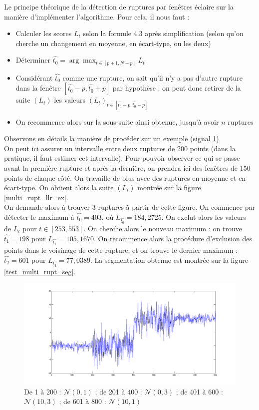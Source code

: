 \documentclass[french,11pt,notitlepage]{report}
\begin{document}
	
	Le principe théorique de la détection de ruptures par fenêtres éclaire sur la manière d'implémenter l'algorithme. Pour cela, il nous faut :
	\begin{itemize}
		\item Calculer les scores $L_t$ selon la formule 4.3 après simplification (selon qu'on cherche un changement en moyenne, en écart-type, ou les deux)
		\item Déterminer $\hat{t_0} = \arg \max_{t \in [p+1, N-p]} L_t$
		\item Considérant $\hat{t_0}$ comme une rupture, on sait qu'il n'y a pas d'autre rupture dans la fenêtre $[\hat{t_0}-p, \hat{t_0}+p]$ par hypothèse ; on peut donc retirer de la suite $(L_t)$ les valeurs $(L_t)_{t \in [\hat{t_0}-p, \hat{t_0}+p]}$
		\item On recommence alors sur la sous-suite ainsi obtenue, jusqu'à avoir $n$ ruptures
	\end{itemize}
	
	Observons en détails la manière de procéder sur un exemple (signal \ref{test_multi_rupt})
\\

	On peut ici assurer un intervalle entre deux ruptures de 200 points (dans la pratique, il faut estimer cet intervalle).
	Pour pouvoir observer ce qui se passe avant la première rupture et après la dernière, on prendra ici des fenêtres de 150 points de chaque côté.
	On travaille de plus avec des ruptures en moyenne et en écart-type.
	On obtient alors la suite $(L_t)$ montrée sur la figure \ref{multi_rupt_llr_ex}.
	\\
	
	On demande alors à trouver 3 ruptures à partir de cette figure.
	On commence par détecter le maximum à $\hat{t_0} = 403$, où $L_{\hat{t_0}} = 184,2725$. On exclut alors les valeurs de $L_t$ pour $t \in [253, 553]$.
	On cherche alors le nouveau maximum : on trouve $\hat{t_1} = 198$ pour $L_{\hat{t_1}} = 105,1670$.
	On recommence alors la procédure d'exclusion des points dans le voisinage de cette rupture, et on trouve le dernier maximum : $\hat{t_2} = 601$ pour $L_{\hat{t_2}} = 77,0389$.
	La segmentation obtenue est montrée sur la figure \ref{test_multi_rupt_seg}.
	
		\begin{figure}[hp]
		\includegraphics[height=0.25\textheight,width=\textwidth]{test_multi_rupt.png}
		\caption{De 1 à 200 : $\mathcal{N}(0,1)$ ; de 201 à 400 : $\mathcal{N}(0,3)$ ; de 401 à 600 : $\mathcal{N}(10,3)$ ; de 601 à 800 : $\mathcal{N}(10,1)$}
		\label{test_multi_rupt}
	\end{figure}
	
\end{document}
